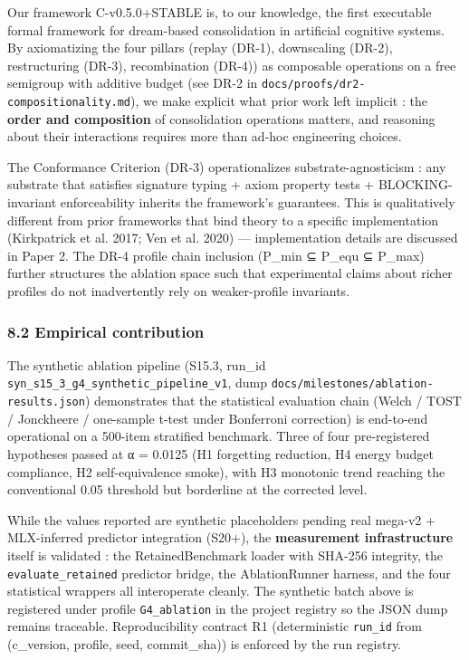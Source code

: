\documentclass[
]{article}
\begin{document}
Our framework C-v0.5.0+STABLE is, to our knowledge, the first executable
formal framework for dream-based consolidation in artificial cognitive
systems. By axiomatizing the four pillars (replay (DR-1), downscaling
(DR-2), restructuring (DR-3), recombination (DR-4)) as composable
operations on a free semigroup with additive budget (see DR-2 in
\texttt{docs/proofs/dr2-compositionality.md}), we make explicit what
prior work left implicit : the \textbf{order and composition} of
consolidation operations matters, and reasoning about their interactions
requires more than ad-hoc engineering choices.

The Conformance Criterion (DR-3) operationalizes substrate-agnosticism :
any substrate that satisfies signature typing + axiom property tests +
BLOCKING-invariant enforceability inherits the framework's guarantees.
This is qualitatively different from prior frameworks that bind theory
to a specific implementation ({Kirkpatrick et al.} 2017; Ven et al.
2020) --- implementation details are discussed in Paper 2. The DR-4
profile chain inclusion (P\_min ⊆ P\_equ ⊆ P\_max) further structures
the ablation space such that experimental claims about richer profiles
do not inadvertently rely on weaker-profile invariants.

\subsubsection{8.2 Empirical contribution}\label{empirical-contribution}

The synthetic ablation pipeline (S15.3, run\_id
\texttt{syn\_s15\_3\_g4\_synthetic\_pipeline\_v1}, dump
\texttt{docs/milestones/ablation-results.json}) demonstrates that the
statistical evaluation chain (Welch / TOST / Jonckheere / one-sample
t-test under Bonferroni correction) is end-to-end operational on a
500-item stratified benchmark. Three of four pre-registered hypotheses
passed at α = 0.0125 (H1 forgetting reduction, H4 energy budget
compliance, H2 self-equivalence smoke), with H3 monotonic trend reaching
the conventional 0.05 threshold but borderline at the corrected level.

While the values reported are synthetic placeholders pending real
mega-v2 + MLX-inferred predictor integration (S20+), the
\textbf{measurement infrastructure} itself is validated : the
RetainedBenchmark loader with SHA-256 integrity, the
\texttt{evaluate\_retained} predictor bridge, the AblationRunner
harness, and the four statistical wrappers all interoperate cleanly. The
synthetic batch above is registered under profile \texttt{G4\_ablation}
in the project registry so the JSON dump remains traceable.
Reproducibility contract R1 (deterministic \texttt{run\_id} from
(c\_version, profile, seed, commit\_sha)) is enforced by the run
registry.
\end{document}
